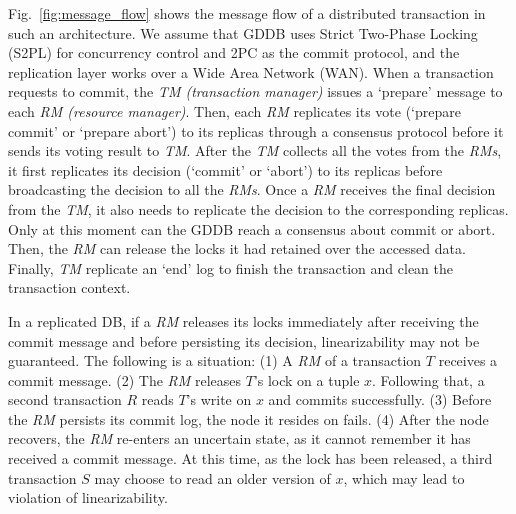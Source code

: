 \documentclass[conference]{IEEEtran}
\begin{document}
Fig.~\ref{fig:message_flow} shows the message flow of a distributed transaction in such an architecture. We assume that
GDDB uses Strict Two-Phase Locking (S2PL) for concurrency control and 2PC as the commit protocol, and the replication layer works over a Wide Area Network (WAN).
When a transaction requests to commit, the \emph{TM (transaction manager)} issues a `prepare' message to each \emph{RM (resource manager)}.
Then, each \emph{RM} replicates its vote (`prepare commit' or `prepare abort') to its replicas through a consensus protocol before it
sends its voting result to \emph{TM}.
After the \emph{TM} collects all the votes from the \emph{RMs}, it first replicates its decision (`commit' or `abort') to its replicas before broadcasting the decision to all the \emph{RMs}.
Once a \emph{RM} receives the final decision from the \emph{TM}, it also needs to replicate the decision to the corresponding replicas.
Only at this moment can the GDDB reach a consensus about commit or abort.
Then, the \emph{RM} can release the locks it had retained over the accessed data.
Finally, \emph{TM} replicate an `end' log to finish the transaction and clean the transaction context.
\begin{highlighted}

In a replicated DB, if a \emph{RM} releases its locks immediately after receiving the commit message and before persisting its decision, linearizability may not be guaranteed. 
The following is a situation:
(1) A \emph{RM} of a transaction ${T}$ receives a commit message.
(2) The \emph{RM} releases ${T}$'s lock on a tuple ${x}$. Following that,
a second transaction ${R}$ reads ${T}$'s write on ${x}$ and commits successfully.
(3) Before the \emph{RM} persists its commit log, the node it resides on fails. 
(4) After the node recovers, the \emph{RM} re-enters an uncertain state, as it cannot remember it has received a commit message. At this time, as the lock has been released, a third transaction ${S}$ may choose to read an older version of ${x}$, which may lead to violation of linearizability.


\end{highlighted}
\end{document}
